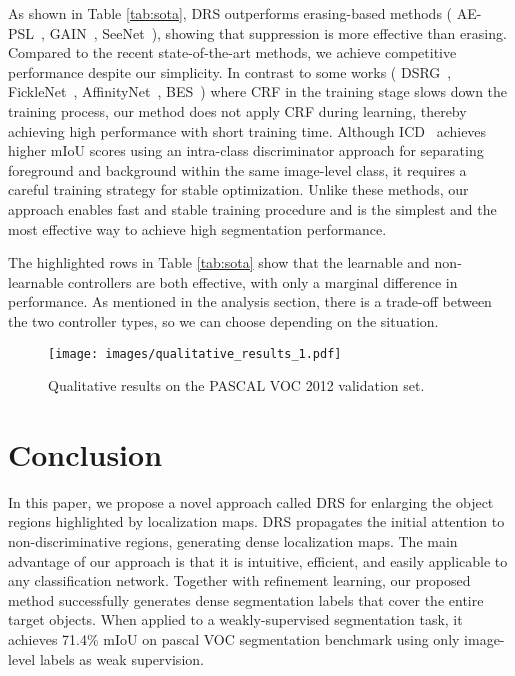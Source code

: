 \documentclass[letterpaper]{article} \usepackage{aaai21}  \usepackage{times}  \usepackage{helvet} \usepackage{courier}  \usepackage[hyphens]{url}  \usepackage{graphicx} \urlstyle{rm} \def\UrlFont{\rm}  \usepackage{natbib}  \usepackage{caption} \frenchspacing  \setlength{\pdfpagewidth}{8.5in}  \setlength{\pdfpageheight}{11in}
\begin{document}
As shown in Table \ref{tab:sota}, DRS outperforms erasing-based methods ( AE-PSL~\cite{wei2017object}, GAIN~\cite{li2018tell}, SeeNet~\cite{hou2018self}), showing that suppression is more effective than erasing.
Compared to the recent state-of-the-art methods, we achieve competitive performance despite our simplicity.
In contrast to some works ( DSRG~\cite{huang2018weakly}, FickleNet~\cite{lee2019ficklenet}, AffinityNet~\cite{ahn2018learning}, BES~\cite{chen2020weakly}) where CRF in the training stage slows down the training process, our method does not apply CRF during learning, thereby achieving high performance with short training time. 
Although ICD~\cite{fan2020learning} achieves higher mIoU scores using an intra-class discriminator approach for separating foreground and background within the same image-level class, it requires a careful training strategy for stable optimization.
Unlike these methods, our approach enables fast and stable training procedure and is the simplest and the most effective way to achieve high segmentation performance.

The highlighted rows in Table \ref{tab:sota} show that the learnable and non-learnable controllers are both effective, with only a marginal difference in performance.
As mentioned in the analysis section, there is a trade-off between the two controller types, so we can choose depending on the situation. 




\begin{figure}[t]
    \centering
    \texttt{[image: images/qualitative\_results\_1.pdf]}
    \caption{
        Qualitative results on the PASCAL VOC 2012 validation set.
    }
    \label{figure:result}
    \vspace{-1mm}
\end{figure}


\section{Conclusion}
In this paper, we propose a novel approach called DRS for enlarging the object regions highlighted by localization maps.
DRS propagates the initial attention to non-discriminative regions, generating dense localization maps.
The main advantage of our approach is that it is intuitive, efficient, and easily applicable to any classification network.
Together with refinement learning, our proposed method successfully generates dense segmentation labels that cover the entire target objects.
When applied to a weakly-supervised segmentation task, it achieves 71.4\% mIoU on pascal VOC segmentation benchmark using only image-level labels as weak supervision.

   


\end{document}
